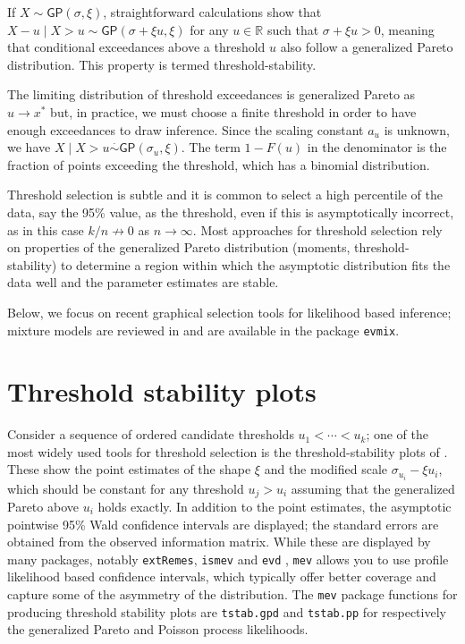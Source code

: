 \documentclass[]{book}
\begin{document}
If \(X \sim \mathsf{GP}(\sigma, \xi)\), straightforward calculations show that \(X-u \mid X>u \sim \mathsf{GP}(\sigma + \xi u, \xi)\) for any \(u \in \mathbb{R}\) such that \(\sigma+\xi u>0\), meaning that conditional exceedances above a threshold \(u\) also follow a generalized Pareto distribution. This property is termed threshold-stability.

The limiting distribution of threshold exceedances is generalized Pareto as \(u \to x^*\) but, in practice, we must choose a finite threshold in order to have enough exceedances to draw inference. Since the scaling constant \(a_u\) is unknown, we have \(X \mid X > u \stackrel{\cdot}{\sim} \mathsf{GP}(\sigma_u, \xi)\). The term \(1-F(u)\) in the denominator is the fraction of points exceeding the threshold, which has a binomial distribution.

Threshold selection is subtle and it is common to select a high percentile of the data, say the
95\% value, as the threshold, even if this is asymptotically incorrect, as in this case \(k/n \nrightarrow 0\) as \(n \to \infty\). Most approaches for threshold selection rely on properties of the
generalized Pareto distribution (moments, threshold-stability) to determine a region within which the asymptotic distribution fits the data well and the parameter estimates are stable.

Below, we focus on recent graphical selection tools for likelihood based inference; mixture models are reviewed in \citet{Scarrott:2012} and are available in the package \texttt{evmix}.

\hypertarget{threshold-stability-plots}{%
\section{Threshold stability plots}\label{threshold-stability-plots}}

Consider a sequence of ordered candidate thresholds \(u_1 < \cdots < u_k\); one of the most widely used tools for threshold selection is the threshold-stability plots of \citet{Davison:1990}. These show the point estimates of the shape \(\xi\) and the modified scale \(\sigma_{u_i}-\xi u_i\), which should be constant for any threshold \(u_{j} >u_i\) assuming that the generalized Pareto above \(u_i\) holds exactly. In addition to the point estimates, the asymptotic pointwise 95\% Wald confidence intervals are displayed; the standard errors are obtained from the observed information matrix. While these are displayed by many packages, notably \texttt{extRemes}, \texttt{ismev} and \texttt{evd} , \texttt{mev} allows you to use profile likelihood based confidence intervals, which typically offer better coverage and capture some of the asymmetry of the distribution. The \texttt{mev} package functions for producing threshold stability plots are \texttt{tstab.gpd} and \texttt{tstab.pp} for respectively the generalized Pareto and Poisson process likelihoods.
\end{document}
